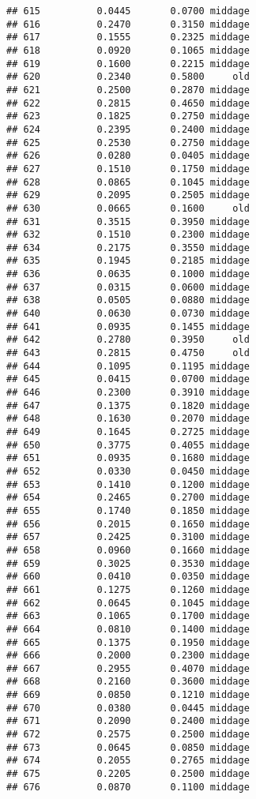 \documentclass[
]{article}
\begin{document}
\begin{verbatim}
## 615          0.0445       0.0700 middage
## 616          0.2470       0.3150 middage
## 617          0.1555       0.2325 middage
## 618          0.0920       0.1065 middage
## 619          0.1600       0.2215 middage
## 620          0.2340       0.5800     old
## 621          0.2500       0.2870 middage
## 622          0.2815       0.4650 middage
## 623          0.1825       0.2750 middage
## 624          0.2395       0.2400 middage
## 625          0.2530       0.2750 middage
## 626          0.0280       0.0405 middage
## 627          0.1510       0.1750 middage
## 628          0.0865       0.1045 middage
## 629          0.2095       0.2505 middage
## 630          0.0665       0.1600     old
## 631          0.3515       0.3950 middage
## 632          0.1510       0.2300 middage
## 634          0.2175       0.3550 middage
## 635          0.1945       0.2185 middage
## 636          0.0635       0.1000 middage
## 637          0.0315       0.0600 middage
## 638          0.0505       0.0880 middage
## 640          0.0630       0.0730 middage
## 641          0.0935       0.1455 middage
## 642          0.2780       0.3950     old
## 643          0.2815       0.4750     old
## 644          0.1095       0.1195 middage
## 645          0.0415       0.0700 middage
## 646          0.2300       0.3910 middage
## 647          0.1375       0.1820 middage
## 648          0.1630       0.2070 middage
## 649          0.1645       0.2725 middage
## 650          0.3775       0.4055 middage
## 651          0.0935       0.1680 middage
## 652          0.0330       0.0450 middage
## 653          0.1410       0.1200 middage
## 654          0.2465       0.2700 middage
## 655          0.1740       0.1850 middage
## 656          0.2015       0.1650 middage
## 657          0.2425       0.3100 middage
## 658          0.0960       0.1660 middage
## 659          0.3025       0.3530 middage
## 660          0.0410       0.0350 middage
## 661          0.1275       0.1260 middage
## 662          0.0645       0.1045 middage
## 663          0.1065       0.1700 middage
## 664          0.0810       0.1400 middage
## 665          0.1375       0.1950 middage
## 666          0.2000       0.2300 middage
## 667          0.2955       0.4070 middage
## 668          0.2160       0.3600 middage
## 669          0.0850       0.1210 middage
## 670          0.0380       0.0445 middage
## 671          0.2090       0.2400 middage
## 672          0.2575       0.2500 middage
## 673          0.0645       0.0850 middage
## 674          0.2055       0.2765 middage
## 675          0.2205       0.2500 middage
## 676          0.0870       0.1100 middage

\end{verbatim}
\end{document}
